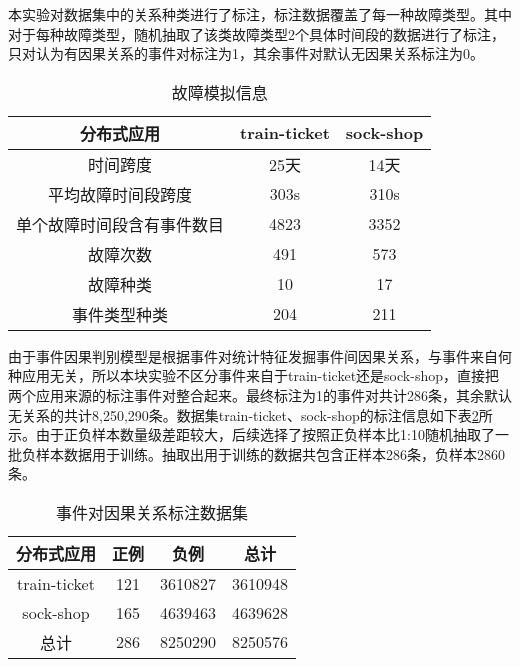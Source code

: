 本实验对数据集中的关系种类进行了标注，标注数据覆盖了每一种故障类型。其中对于每种故障类型，随机抽取了该类故障类型2个具体时间段的数据进行了标注，只对认为有因果关系的事件对标注为1，其余事件对默认无因果关系标注为0。
\begin{table}[htbp]
    \caption{故障模拟信息}
    \centering
    \label{failure-simulation-info}
    \begin{tabular}{ccc}
    \toprule[1.5pt]
    分布式应用       & train-ticket & \multicolumn{1}{c}{sock-shop} \\ \midrule[1.5pt]
    时间跨度       & 25天          & 14天                           \\
    平均故障时间段跨度  & 303s         & 310s                          \\
    单个故障时间段含有事件数目 & 4823         & 3352                          \\
    故障次数       & 491          & 573                           \\
    故障种类       & 10           & 17                            \\
    事件类型种类     & 204          & 211                           \\ 
    \bottomrule[1.5pt]
    \end{tabular}
\end{table}

由于事件因果判别模型是根据事件对统计特征发掘事件间因果关系，与事件来自何种应用无关，所以本块实验不区分事件来自于train-ticket还是sock-shop，直接把两个应用来源的标注事件对整合起来。最终标注为1的事件对共计286条，其余默认无关系的共计8,250,290‬条。数据集train-ticket、sock-shop的标注信息如下表\ref{event-cause-label}所示。由于正负样本数量级差距较大，后续选择了按照正负样本比1:10随机抽取了一批负样本数据用于训练。抽取出用于训练的数据共包含正样本286条，负样本2860条。
\newpage
\begin{table}[htbp]
    \caption{事件对因果关系标注数据集}
    \centering
    \label{event-cause-label}
    \begin{tabular}{cccc}
    \toprule[1.5pt]
        分布式应用     & 正例  & 负例      & 总计      \\ \midrule[1.5pt]
    train-ticket & 121 & 3610827 & 3610948 \\
    sock-shop    & 165 & 4639463 & 4639628 \\ \midrule[1pt]
    总计           & 286 & 8250290 & 8250576 \\ 
    \bottomrule[1.5pt]
    \end{tabular}
\end{table}

